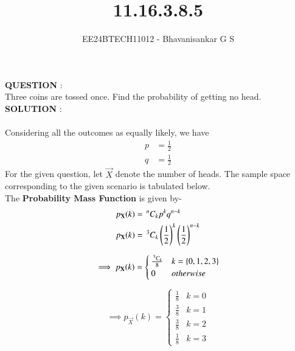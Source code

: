 \documentclass[journal]{IEEEtran}
\newcommand{\nCr}[2]{\,^{#1}C_{#2}}
\begin{document}

\vspace{3cm}

\title{11.16.3.8.5}
\author{EE24BTECH11012 - Bhavanisankar G S}
{\let\newpage\relax\maketitle}

\renewcommand{\thefigure}{\theenumi}
\renewcommand{\thetable}{\theenumi}
\setlength{\intextsep}{10pt} %


\renewcommand{\thetable}{\theenumi}

\textbf{QUESTION} : \\
Three coins are tossed once. Find the probability of getting no head.\\
\textbf{SOLUTION} : \\

 \\
Considering all the outcomes as equally likely, we have
\begin{align}
	p &= \frac{1}{2} \\
	q &= \frac{1}{2}
\end{align}
For the given question, let $\vec{X}$ denote the number of heads. The sample space corresponding to the given scenario is tabulated below. \\

The \textbf{Probability Mass Function} is given by-
\begin{align}
	p_{\vec{X}} (k) &= \nCr{n}{k} p^{k} q^{n-k} \\ 
	p_{\vec{X}} (k) &= \nCr{3}{k} \brak{\frac{1}{2}}^k \brak{\frac{1}{2}}^{n-k}
\end{align}

\[
\implies p_{\vec{X}} (k) = 
\begin{cases}
	\frac{\nCr{3}{k}}{8} & k = \cbrak{0,1,2,3} \\
	0 & otherwise
\end{cases}
\]

\[
\implies p_{\vec{X}} (k) = 
\begin{cases}
	\frac{1}{8} & k = 0 \\
	\frac{3}{8} & k = 1 \\
	\frac{3}{8} & k = 2 \\
	\frac{1}{8} & k = 3
\end{cases}
\]
\end{document}
